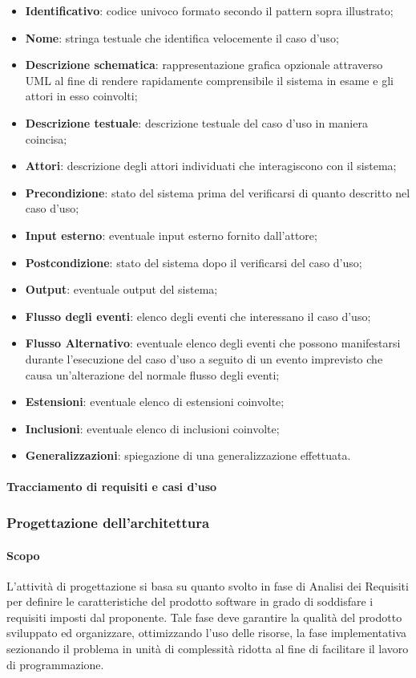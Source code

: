 \begin{itemize}
  \item \textbf{Identificativo}: codice univoco formato secondo il pattern sopra illustrato;
  \item \textbf{Nome}: stringa testuale che identifica velocemente il caso d'uso;
  \item \textbf{Descrizione schematica}: rappresentazione grafica opzionale attraverso UML al fine di rendere rapidamente comprensibile il sistema in esame e gli attori in esso coinvolti;
  \item \textbf{Descrizione testuale}: descrizione testuale del caso d'uso in maniera coincisa;
  \item \textbf{Attori}: descrizione degli attori individuati che interagiscono con il sistema;
  \item \textbf{Precondizione}: stato del sistema prima del verificarsi di quanto descritto nel caso d'uso;
  \item \textbf{Input esterno}: eventuale input esterno fornito dall'attore;
  \item \textbf{Postcondizione}: stato del sistema dopo il verificarsi del caso d'uso;
  \item \textbf{Output}: eventuale output del sistema;
  \item \textbf{Flusso degli eventi}: elenco degli eventi che interessano il caso d'uso;
  \item \textbf{Flusso Alternativo}: eventuale elenco degli eventi che possono manifestarsi durante l'esecuzione del caso d'uso a seguito di un evento imprevisto che causa un'alterazione del normale flusso degli eventi;
  \item \textbf{Estensioni}: eventuale elenco di estensioni coinvolte;
  \item \textbf{Inclusioni}: eventuale elenco di inclusioni coinvolte;
  \item \textbf{Generalizzazioni}: spiegazione di una generalizzazione effettuata.
\end{itemize}

\paragraph{Tracciamento di requisiti e casi d'uso}

\subsubsection{Progettazione dell'architettura}
\paragraph{Scopo}
L'attività di progettazione si basa su quanto svolto in fase di Analisi dei Requisiti per definire le caratteristiche del prodotto software in grado di soddisfare i requisiti imposti dal proponente.  Tale fase deve garantire la qualità del prodotto sviluppato ed organizzare, ottimizzando l'uso delle risorse, la fase implementativa sezionando il problema in unità di complessità ridotta al fine di facilitare il lavoro di programmazione.

